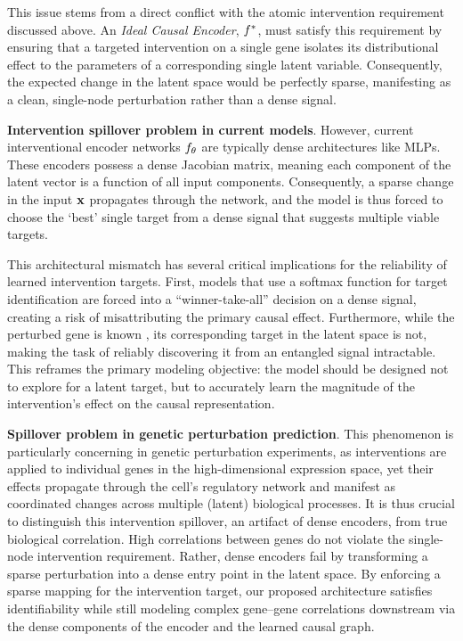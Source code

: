 This issue stems from a direct conflict with the atomic intervention requirement discussed above.
An \emph{Ideal Causal Encoder}, $f^*$, must satisfy this requirement by ensuring that a targeted intervention on a single gene isolates its distributional effect to the parameters of a corresponding single latent variable.
Consequently, the expected change in the latent space would be perfectly sparse, manifesting as a clean, single-node perturbation rather than a dense signal.

\textbf{Intervention spillover problem in current models}. However, current interventional encoder networks $f_\theta$ are typically dense architectures like MLPs.
These encoders possess a dense Jacobian matrix, meaning each component of the latent vector is a function of all input components.
Consequently, a sparse change in the input ${\mathbf{x}}$ propagates through the network, and the model is thus forced to choose the `best' single target from a dense signal that suggests multiple viable targets.

This architectural mismatch has several critical implications for the reliability of learned intervention targets.
First, models that use a softmax function for target identification are forced into a ``winner-take-all'' decision on a dense signal, creating a risk of misattributing the primary causal effect.
Furthermore, while the perturbed gene is known \apriori, its corresponding target in the latent space is not, making the task of reliably discovering it from an entangled signal intractable.
This reframes the primary modeling objective: the model should be designed not to explore for a latent target, but to accurately learn the magnitude of the intervention's effect on the causal representation.

\textbf{Spillover problem in genetic perturbation prediction}. This phenomenon is particularly concerning in genetic perturbation experiments, as interventions are applied to individual genes in the high-dimensional expression space, yet their effects propagate through the cell's regulatory network and manifest as coordinated changes across multiple (latent) biological processes.
It is thus crucial to distinguish this intervention spillover, an artifact of dense encoders, from true biological correlation. High correlations between genes do not violate the single-node intervention requirement.
Rather, dense encoders fail by transforming a sparse perturbation into a dense entry point in the latent space.
By enforcing a sparse mapping for the intervention target, our proposed architecture satisfies identifiability while still modeling complex gene--gene correlations downstream via the dense components of the encoder and the learned causal graph.


